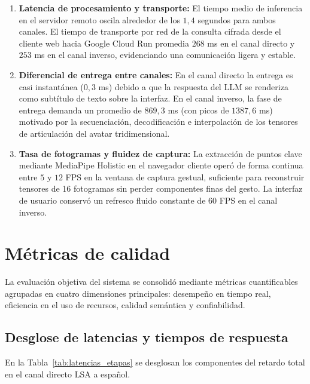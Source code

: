 \begin{enumerate}
    \item \textbf{Latencia de procesamiento y transporte:} El tiempo medio de inferencia en el servidor remoto oscila alrededor de los $1{,}4$ segundos para ambos canales. El tiempo de transporte por red de la consulta cifrada desde el cliente web hacia Google Cloud Run promedia $268$ ms en el canal directo y $253$ ms en el canal inverso, evidenciando una comunicación ligera y estable.
    \item \textbf{Diferencial de entrega entre canales:} En el canal directo la entrega es casi instantánea ($0{,}3$ ms) debido a que la respuesta del LLM se renderiza como subtítulo de texto sobre la interfaz. En el canal inverso, la fase de entrega demanda un promedio de $869{,}3$ ms (con picos de $1387{,}6$ ms) motivado por la secuenciación, decodificación e interpolación de los tensores de articulación del avatar tridimensional.
    \item \textbf{Tasa de fotogramas y fluidez de captura:} La extracción de puntos clave mediante MediaPipe Holistic en el navegador cliente operó de forma continua entre $5$ y $12$ FPS en la ventana de captura gestual, suficiente para reconstruir tensores de 16 fotogramas sin perder componentes finas del gesto. La interfaz de usuario conservó un refresco fluido constante de $60$ FPS en el canal inverso.
\end{enumerate}

\section{Métricas de calidad}
\label{sec:metricas_calidad}

La evaluación objetiva del sistema se consolidó mediante métricas cuantificables agrupadas en cuatro dimensiones principales: desempeño en tiempo real, eficiencia en el uso de recursos, calidad semántica y confiabilidad.

\subsection{Desglose de latencias y tiempos de respuesta}
\label{sec:latencias_pipeline}
En la Tabla~\ref{tab:latencias_etapas} se desglosan los componentes del retardo total en el canal directo LSA a español.

